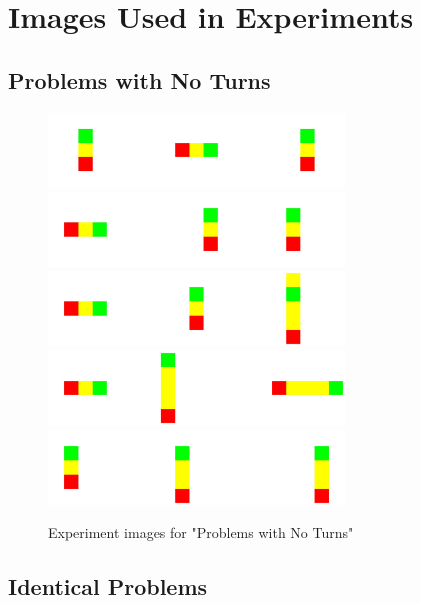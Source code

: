 \newpage \hfill
\section{Images Used in Experiments}
\subsection{Problems with No Turns}

\begin{figure}[h!]
\centering
\includegraphics[width=0.7\textwidth]{experiment_images/p1.png}
\includegraphics[width=0.7\textwidth]{experiment_images/p2.png}
\includegraphics[width=0.7\textwidth]{experiment_images/p3.png}
\includegraphics[width=0.7\textwidth]{experiment_images/p4.png}
\includegraphics[width=0.7\textwidth]{experiment_images/p5.png}
\caption{Experiment images for "Problems with No Turns"}
\end{figure}

\newpage \hfill
\subsection{Identical Problems}

